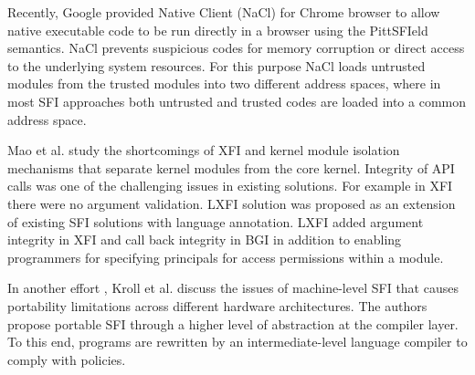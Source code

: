 Recently, Google provided Native Client (NaCl) \cite{NaCl-09} for Chrome browser to allow native executable code to be run directly in a browser using the PittSFIeld semantics. NaCl prevents suspicious codes for memory corruption or direct access to the underlying system resources. For this purpose NaCl loads untrusted modules from the trusted modules into two different address spaces, where in most SFI approaches both untrusted and trusted codes are loaded into a common address space. 

Mao et al. \cite{LXFI} study the shortcomings of XFI \cite{XFI} and \cite{Castro-BGI} kernel module isolation mechanisms that separate kernel modules from the core kernel. Integrity of API calls was one of the challenging issues in existing solutions. For example in XFI there were no argument validation. LXFI solution was proposed as an extension of existing SFI solutions with language annotation. LXFI added argument integrity in XFI and call back integrity in BGI in addition to enabling programmers for specifying principals for access permissions within a module.

In another effort \cite{PSFI}, Kroll et al. discuss the issues of machine-level SFI that causes portability limitations across different hardware architectures. The authors propose portable SFI through a higher level of abstraction at the compiler layer. To this end, programs are rewritten by an intermediate-level language compiler to comply with policies.



